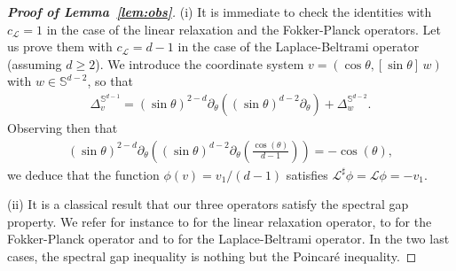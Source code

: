 \documentclass[11pt]{amsart}
\theoremstyle{definition}
\theoremstyle{remark}
\numberwithin{equation}{section}
\def\LL{{\mathcal L}}
\begin{document}
\begin{proof}[{\bf Proof of Lemma~\ref{lem:obs}}]
  (i) It is immediate to check the identities with $c_\LL=1$ in the case of the linear relaxation and the Fokker-Planck operators. Let us prove them with $c_\LL = d-1$ in the case of the Laplace-Beltrami operator (assuming $d \ge 2$). We introduce the coordinate system $v=(\cos \theta,[\sin \theta] \, w)$ with $w \in \mathbb S^{d-2}$, so that
    \begin{align*}
      \Delta^{\mathbb S^{d-1}}_v = (\sin \theta)^{2-d} \partial_{\theta} \left( (\sin \theta)^{d-2} \partial_\theta \right)+ \Delta^{\mathbb S^{d-2}}_w .
    \end{align*}
  Observing then that
    \begin{align*}
      (\sin \theta)^{2-d} \partial_{\theta} \left( (\sin \theta)^{d-2} \partial_\theta \left( \frac{\cos(\theta)}{d-1} \right)\right) = - \cos(\theta),
    \end{align*}
  we deduce that the function $\phi(v) = v_1/(d-1)$ satisfies $\mathcal L^\sharp \phi = \mathcal L \phi = -v_1$.
  \smallskip

  \noindent
  (ii) It is a classical result that our three operators satisfy the spectral gap property. We refer for instance to \cite{MR1803225,MR2162224} for the linear relaxation operator,
  to \cite{MR2386063,MR3155209} for the Fokker-Planck operator and to \cite{MR3155209} for the Laplace-Beltrami operator.
  In the two last cases, the spectral gap inequality is nothing but the Poincaré inequality.
\end{proof}
\end{document}
